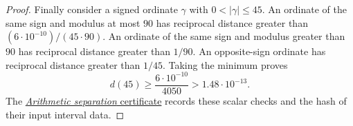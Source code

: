 \begin{proof}
Finally consider a signed ordinate \(\gamma\) with
\(0<|\gamma|\le45\). An ordinate of the same sign and modulus
at most \(90\) has reciprocal distance greater than
\((6\cdot10^{-10})/(45\cdot90)\).
An ordinate of the same sign and modulus greater than \(90\)
has reciprocal distance greater than \(1/90\).
An opposite-sign ordinate has reciprocal distance greater than
\(1/45\). Taking the minimum proves
\[
 d(45)\ge\frac{6\cdot10^{-10}}{4050}
          >1.48\cdot10^{-13}.
\]
The \href{\workbenchurl}{\emph{Arithmetic separation} certificate}
records these scalar checks and the hash of their input interval data.
\end{proof}
